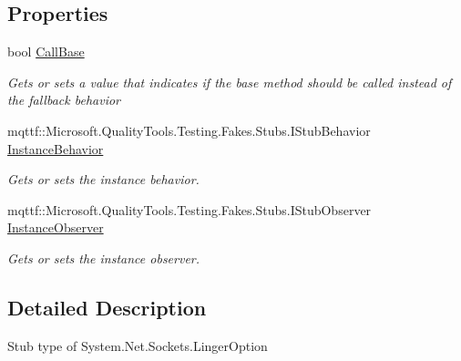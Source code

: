 \subsection*{Properties}
\begin{DoxyCompactItemize}
\item 
bool \hyperlink{class_system_1_1_net_1_1_sockets_1_1_fakes_1_1_stub_linger_option_a09a33b5b144a4a2e542fe335f5ffed9a}{Call\-Base}
\begin{DoxyCompactList}\small\item\em Gets or sets a value that indicates if the base method should be called instead of the fallback behavior\end{DoxyCompactList}\item 
mqttf\-::\-Microsoft.\-Quality\-Tools.\-Testing.\-Fakes.\-Stubs.\-I\-Stub\-Behavior \hyperlink{class_system_1_1_net_1_1_sockets_1_1_fakes_1_1_stub_linger_option_a7c841336833d1a35eb82613a2bcc906b}{Instance\-Behavior}
\begin{DoxyCompactList}\small\item\em Gets or sets the instance behavior.\end{DoxyCompactList}\item 
mqttf\-::\-Microsoft.\-Quality\-Tools.\-Testing.\-Fakes.\-Stubs.\-I\-Stub\-Observer \hyperlink{class_system_1_1_net_1_1_sockets_1_1_fakes_1_1_stub_linger_option_aa0a93a49803db9286822bd859ae60c2f}{Instance\-Observer}
\begin{DoxyCompactList}\small\item\em Gets or sets the instance observer.\end{DoxyCompactList}\end{DoxyCompactItemize}


\subsection{Detailed Description}
Stub type of System.\-Net.\-Sockets.\-Linger\-Option



